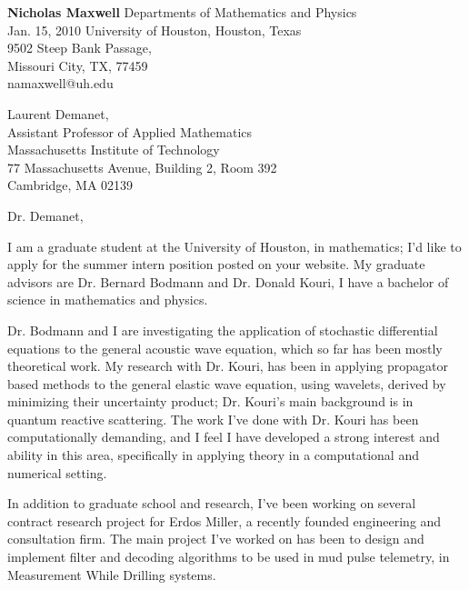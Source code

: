 \documentclass[11pt]{article}
\begin{document}
\vspace{2in}

\begin{flushright}
{\bf Nicholas Maxwell} \hfill Departments of Mathematics and Physics \\
 Jan. 15, 2010 \hfill  University of Houston, Houston, Texas \\
 \hfill  9502 Steep Bank Passage,\\
 \hfill Missouri City, TX, 77459 \\
 \hfill  namaxwell@uh.edu\\
\end{flushright}


\begin{flushleft}
Laurent Demanet,\\
Assistant Professor of Applied Mathematics \\
Massachusetts Institute of Technology \\
77 Massachusetts Avenue, Building 2, Room 392\\
Cambridge, MA 02139
\end{flushleft}


\begin{flushleft}
Dr. Demanet,\\
\end{flushleft}


I am a graduate student at the University of Houston, in mathematics; I'd like to apply for the summer intern position posted on your website. My graduate advisors are Dr. Bernard Bodmann and Dr. Donald Kouri, I have a bachelor of science in mathematics and physics.

Dr. Bodmann and I are investigating the application of stochastic differential equations to the general acoustic wave equation, which so far has been mostly theoretical work. My research with Dr. Kouri, has been in applying propagator based methods to the general elastic wave equation, using wavelets, derived by minimizing their uncertainty product; Dr. Kouri's main background is in quantum reactive scattering. The work I've done with Dr. Kouri has been computationally demanding, and I feel I have developed a strong interest and ability in this area, specifically in applying theory in a computational and numerical setting.

In addition to graduate school and research, I've been working on several contract research project for Erdos Miller, a recently founded engineering and consultation firm. The main project I've worked on has been to design and implement filter and decoding algorithms to be used in mud pulse telemetry, in Measurement While Drilling systems.
\end{document}
